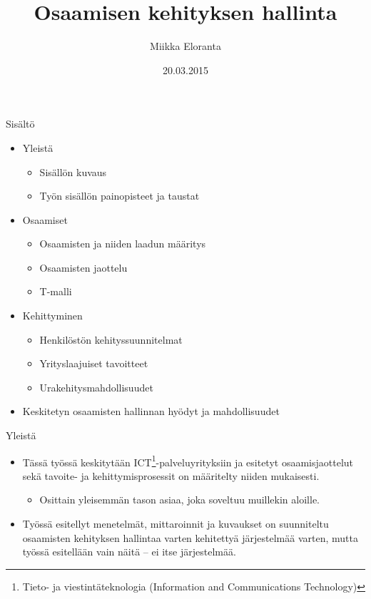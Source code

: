\documentclass[first=purple,second=dblue,logo=redquo]{aaltoslides}
\title{Osaamisen kehityksen hallinta}
\author[M. Eloranta]{Miikka Eloranta}
\institute[AS]{Automaatio- ja systeemitekniikka\\
Sähkötekniikan korkeakoulu, Aalto-yliopisto}
\date{20.03.2015}
\begin{document}
\aaltotitleframe

\begin{frame}{Sisältö}
\begin{itemize}
\item Yleistä
\begin{itemize}
\item Sisällön kuvaus
\item Työn sisällön painopisteet ja taustat
\end{itemize}
\item Osaamiset
\begin{itemize}
\item Osaamisten ja niiden laadun määritys
\item Osaamisten jaottelu
\item T-malli
\end{itemize}
\item Kehittyminen
\begin{itemize}
\item Henkilöstön kehityssuunnitelmat
\item Yrityslaajuiset tavoitteet
\item Urakehitysmahdollisuudet
\end{itemize}
\item Keskitetyn osaamisten hallinnan hyödyt ja mahdollisuudet
\end{itemize}
\end{frame}

\begin{frame}{Yleistä}
\begin{itemize}
\item Tässä työssä keskitytään ICT\footnote{\tiny{Tieto- ja viestintäteknologia (Information and Communications Technology)}}-palveluyrityksiin ja esitetyt osaamisjaottelut sekä tavoite- ja kehittymisprosessit on määritelty niiden mukaisesti.
\begin{itemize}
\item Osittain yleisemmän tason asiaa, joka soveltuu muillekin aloille.
\end{itemize}
\item Työssä esitellyt menetelmät, mittaroinnit ja kuvaukset on suunniteltu osaamisten kehityksen hallintaa varten kehitettyä järjestelmää varten, mutta työssä esitellään vain näitä -- ei itse järjestelmää.
\end{itemize}
\end{frame}
\end{document}
